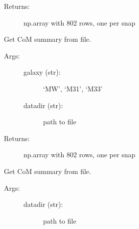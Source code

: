 \documentclass[letterpaper,10pt,english]{sphinxmanual}
\begin{document}
\begin{fulllineitems}
\begin{fulllineitems}
\begin{description}
\begin{description}
\end{description}

\item[{Returns:}] \leavevmode
np.array with 802 rows, one per snap

\end{description}

\end{fulllineitems}


\begin{fulllineitems}
\label{\detokenize{timecourse:galaxy.timecourse.TimeCourse.read_angmom_file}}
Get CoM summary from file.
\begin{description}
\item[{Args:}] \leavevmode\begin{description}
\item[{galaxy (str): }] \leavevmode
‘MW’, ‘M31’, ‘M33’

\item[{datadir (str):}] \leavevmode
path to file

\end{description}

\item[{Returns:}] \leavevmode
np.array with 802 rows, one per snap

\end{description}

\end{fulllineitems}


\begin{fulllineitems}
\label{\detokenize{timecourse:galaxy.timecourse.TimeCourse.read_total_com_file}}
Get CoM summary from file.
\begin{description}
\item[{Args:}] \leavevmode\begin{description}
\item[{datadir (str):}] \leavevmode
path to file


\end{description}
\end{description}
\end{fulllineitems}
\end{fulllineitems}
\end{document}
